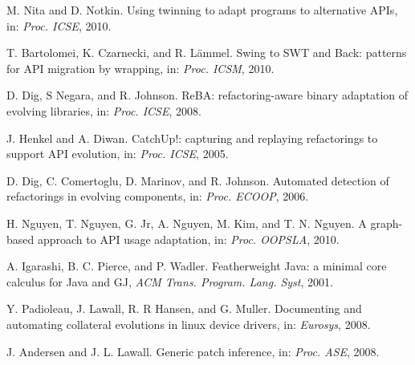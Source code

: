 \documentclass{sigplanconf}
\begin{document}
\begin{thebibliography}{}
\softraggedright

    M. Nita and D. Notkin. Using twinning to adapt programs to alternative APIs, in: \emph{Proc. ICSE}, 2010. 

    T. Bartolomei, K. Czarnecki, and R. L\"ammel. Swing to SWT and Back: patterns
    for API migration by wrapping, in: \emph{Proc. ICSM}, 2010.

    D. Dig, S Negara, and R. Johnson. ReBA: refactoring-aware binary 
    adaptation of evolving libraries,
    in: \emph{Proc. ICSE}, 2008.

    J. Henkel and A. Diwan. CatchUp!: capturing and replaying refactorings to support
    API evolution, in: \emph{Proc. ICSE}, 2005.

    D. Dig, C. Comertoglu, D. Marinov, and R. Johnson. Automated detection of refactorings
    in evolving components, in: \emph{Proc. ECOOP}, 2006.

    H. Nguyen, T. Nguyen, G. Jr, A. Nguyen, M. Kim, and T. N. Nguyen.
    A graph-based approach to API usage adaptation, in: \emph{Proc. OOPSLA}, 2010.



    A. Igarashi, B. C. Pierce, and P. Wadler. Featherweight Java: a
    minimal core calculus for Java and GJ, \emph{ACM Trans. Program.
    Lang. Syst}, 2001.

    Y. Padioleau, J. Lawall, R. R Hansen, and G. Muller. Documenting and automating
    collateral evolutions in linux device drivers, in: \emph{Eurosys}, 2008.

    J. Andersen and J. L. Lawall. Generic patch inference, in: \emph{Proc. ASE}, 2008.


\end{thebibliography}
\end{document}
